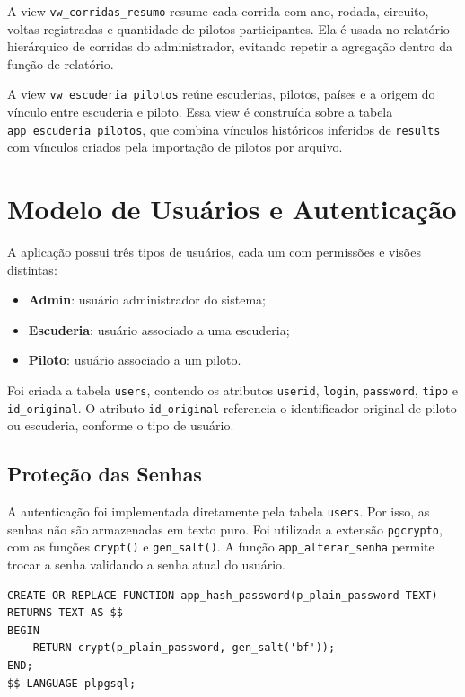 \documentclass[12pt,a4paper]{article}
\begin{document}
A view \texttt{vw\_corridas\_resumo} resume cada corrida com ano, rodada, circuito, voltas registradas e quantidade de pilotos participantes. Ela é usada no relatório hierárquico de corridas do administrador, evitando repetir a agregação dentro da função de relatório.

A view \texttt{vw\_escuderia\_pilotos} reúne escuderias, pilotos, países e a origem do vínculo entre escuderia e piloto. Essa view é construída sobre a tabela \texttt{app\_escuderia\_pilotos}, que combina vínculos históricos inferidos de \texttt{results} com vínculos criados pela importação de pilotos por arquivo.

\section{Modelo de Usuários e Autenticação}

A aplicação possui três tipos de usuários, cada um com permissões e visões distintas:

\begin{itemize}
    \item \textbf{Admin}: usuário administrador do sistema;
    \item \textbf{Escuderia}: usuário associado a uma escuderia;
    \item \textbf{Piloto}: usuário associado a um piloto.
\end{itemize}

Foi criada a tabela \texttt{users}, contendo os atributos \texttt{userid}, \texttt{login}, \texttt{password}, \texttt{tipo} e \texttt{id\_original}. O atributo \texttt{id\_original} referencia o identificador original de piloto ou escuderia, conforme o tipo de usuário.

\subsection{Proteção das Senhas}

A autenticação foi implementada diretamente pela tabela \texttt{users}. Por isso, as senhas não são armazenadas em texto puro. Foi utilizada a extensão \texttt{pgcrypto}, com as funções \texttt{crypt()} e \texttt{gen\_salt()}. A função \texttt{app\_alterar\_senha} permite trocar a senha validando a senha atual do usuário.

\begin{lstlisting}[style=sqlstyle]
CREATE OR REPLACE FUNCTION app_hash_password(p_plain_password TEXT)
RETURNS TEXT AS $$
BEGIN
    RETURN crypt(p_plain_password, gen_salt('bf'));
END;
$$ LANGUAGE plpgsql;
\end{lstlisting}
\end{document}
